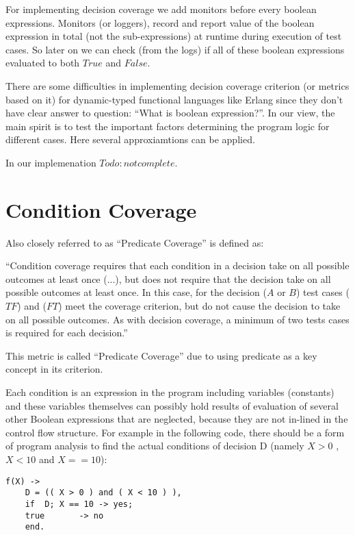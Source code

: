 \documentclass[12pt,a4paper]{report}
\begin{document}
For implementing decision coverage we add monitors before every boolean expressions. Monitors (or loggers), record and report value of the boolean
 expression in total (not the sub-expressions) at runtime during execution of test cases. So later on we can check (from the logs) if all of these
 boolean expressions evaluated to both $True$ and $False$.

There are some difficulties in implementing decision coverage criterion (or metrics based on it) for dynamic-typed functional languages like Erlang since
 they don't have clear answer to question: ``What is boolean expression?''. In our view, the main spirit is to test the important factors determining the
 program logic for different cases. Here several approxiamtions can be applied. 

In our implemenation $Todo: not complete$.  
 
\section{Condition Coverage}
Also closely referred to as “Predicate Coverage” is defined as:

“Condition coverage requires that each condition in a decision take on all possible outcomes at least once (...), but does not require that the decision
 take on all possible outcomes at least once. In this case, for the decision ($A$ or $B$) test cases ($TF$) and ($FT$) meet the coverage criterion, but do
 not cause the decision to take on all possible outcomes. As with decision coverage, a minimum of two tests cases is required for each decision.”
\cite{KellyJ.:2001:PTM:886632}

This metric is called “Predicate Coverage” due to using predicate as a key concept in its criterion.

Each condition is an expression in the program including variables (constants) and these variables themselves can possibly hold results of evaluation of
 several other Boolean expressions that are neglected, because they are not in-lined in the control flow structure. For example in the following code, there
 should be a form of program analysis to find the actual conditions of decision D (namely $X>0$ , $X<10$ and $X==10$):

\begin{lstlisting}
f(X) -> 
    D = (( X > 0 ) and ( X < 10 ) ),
    if	D; X == 10 -> yes;
	true       -> no
    end.  
\end{lstlisting}
\end{document}
